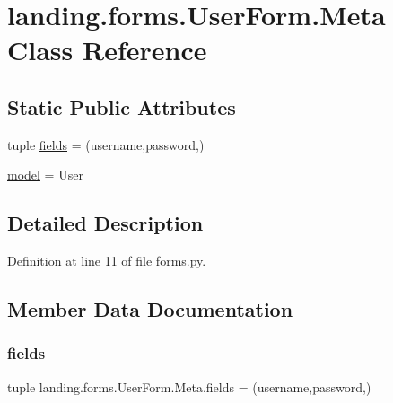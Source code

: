 \hypertarget{classlanding_1_1forms_1_1UserForm_1_1Meta}{}\section{landing.\+forms.\+User\+Form.\+Meta Class Reference}
\label{classlanding_1_1forms_1_1UserForm_1_1Meta}
\subsection*{Static Public Attributes}
\begin{DoxyCompactItemize}
\item 
tuple \mbox{\hyperlink{classlanding_1_1forms_1_1UserForm_1_1Meta_a2a26315d592e1403fcc83d8d3437d345}{fields}} = (\textquotesingle{}username\textquotesingle{},\textquotesingle{}password\textquotesingle{},)
\item 
\mbox{\hyperlink{classlanding_1_1forms_1_1UserForm_1_1Meta_ad36e35754db9ad189c731528a0ec160e}{model}} = User
\end{DoxyCompactItemize}


\subsection{Detailed Description}


Definition at line 11 of file forms.\+py.



\subsection{Member Data Documentation}
\mbox{\label{classlanding_1_1forms_1_1UserForm_1_1Meta_a2a26315d592e1403fcc83d8d3437d345}} 
\subsubsection{\texorpdfstring{fields}{fields}}
{\footnotesize\ttfamily tuple landing.\+forms.\+User\+Form.\+Meta.\+fields = (\textquotesingle{}username\textquotesingle{},\textquotesingle{}password\textquotesingle{},)\hspace{0.3cm}{\ttfamily [static]}}



